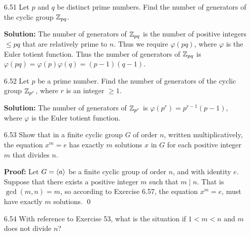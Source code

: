 \begin{enumerate}
      \textbf{Proof:} Consider the element $(xax^{-1})^2$. Thus we have that
      \begin{align*}
         (xax^{-1})^2 &= (xax^{-1})(xax^{-1}) \\
            &= xax^{-1}xax^{-1} \\
            &= xaeax^{-1} \\
            &= xa^2x^{-1} \\
            &= xex^{-1} \\
            &= xx^{-1} = e, \\
      \end{align*}
      so that $|xax^{-1}| \le 2$. Suppose $|xax^{-1}| = 1$. This means that
      $xax^{-1} = e$. Using the Cancellation Law twice will show us that
      $a = e$, a contradiction since $|a| = 2$. Thus we must have that
      $|xax^{-1}| = 2$. But since $a$ is the unique element in $G$ with order 2, 
      it must follow that $xax^{-1} = a$, so that $xa = ax$ by the Cancellation 
      Law. \qed
   \item[6.51] Let $p$ and $q$ be distinct prime numbers. Find the number of
               generators of the cyclic group $\mathbb{Z}_{pq}$.

      \textbf{Solution:} The number of generators of $\mathbb{Z}_{pq}$ is the number of
      positive integers $\le pq$ that are relatively prime to $n$. Thus we
      require $\varphi(pq)$, where $\varphi$ is the Euler totient function. Thus
      the number of generators of
      $\mathbb{Z}_{pq}$ is $\varphi(pq) = \varphi(p)\varphi(q) = (p - 1)(q - 1)$.
   \item[6.52] Let $p$ be a prime number. Find the number of generators of the
               cyclic group $\mathbb{Z}_{p^r}$, where $r$ is an integer $\ge 1$.

      \textbf{Solution:} The number of generators of
      $\mathbb{Z}_{p^r}$ is $\varphi(p^r) = p^{r - 1}(p - 1)$, where $\varphi$ is the 
      Euler totient function.
   \item[6.53] Show that in a finite cyclic group $G$ of order $n$, written
               multiplicatively, the equation $x^m = e$ has exactly $m$
               solutions $x$ in $G$ for each positive integer $m$ that divides
               $n$.

      \textbf{Proof:} Let $G = \langle a \rangle$ be a finite cyclic group of order $n$,
      and with identity $e$. Suppose that there exists a positive integer $m$
      such that $m \mid n$. That is $\gcd(m, n) = m$, so according to Exercise
      6.57, the equation $x^m = e$, must have exactly $m$ solutions. \qed
   \item[6.54] With reference to Exercise 53, what is the situation if
               $1 < m < n$ and $m$ does not divide $n$?
               

\end{enumerate}
